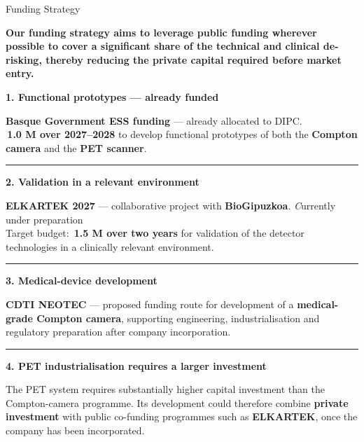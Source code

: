 \documentclass[aspectratio=169,11pt]{beamer}
\begin{document}
\begin{frame}[t]{Funding Strategy}

\begin{center}
{\scriptsize\bfseries\color{darkred}
Our funding strategy aims to leverage public funding wherever possible to cover a significant share of the technical and clinical de-risking, thereby reducing the private capital required before market entry.
}

\end{center}




{\scriptsize\bfseries\color{PTblue}
1. Functional prototypes — already funded
}

{\tiny
\textbf{Basque Government ESS funding} — already allocated to DIPC.\\
\textbf{\EUR\,1.0 M over 2027--2028} to develop functional prototypes of both
the \textbf{Compton camera} and the \textbf{PET scanner}.
}

{\color{gray!35}\rule{\textwidth}{0.35pt}}


{\scriptsize\bfseries\color{PTblue}
2. Validation in a relevant environment
}

{\tiny
\textbf{ELKARTEK 2027} — collaborative project with \textbf{BioGipuzkoa}. {\emph Currently under preparation}\\
Target budget: \textbf{\EUR\,1.5 M over two years} for validation of the detector
technologies in a clinically relevant environment.
}

{\color{gray!35}\rule{\textwidth}{0.35pt}}


{\scriptsize\bfseries\color{PTblue}
3. Medical-device development
}

{\tiny
\textbf{CDTI NEOTEC} — proposed funding route for development of a
\textbf{medical-grade Compton camera}, supporting engineering,
industrialisation and regulatory preparation after company incorporation.
}

{\color{gray!35}\rule{\textwidth}{0.35pt}}


{\scriptsize\bfseries\color{PTblue}
4. PET industrialisation requires a larger investment
}

{\tiny
The PET system requires substantially higher capital investment than the
Compton-camera programme. Its development could therefore combine
\textbf{private investment} with public co-funding programmes such as
\textbf{ELKARTEK}, once the company has been incorporated.
}



\end{frame}
\end{document}
